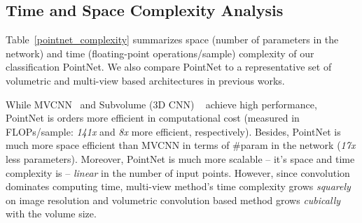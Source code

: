 \documentclass[10pt,twocolumn,letterpaper]{article}
\begin{document}
\begin{comment}
We start from a max pooled vector of a specific input point cloud , and find a set of point cloud  (it's a set of point sets) where each point cloud in the set  will result in the same max pooled vector as to . In another word, we will reconstruct the input with only the knowledge of  and the network parameters.

Assuming when feeding input point cloud  to the network the first max-pooling layer's output is , where . We achieve the reconstruction by firstly construct a dense volumetric grids. Each voxel represents a point in 3D space. Then we will sweep through each point  in the volume and judge whether this point's feature  has any value larger than that in the corresponding dimension of . If there is , it means the point  cannot be the input that results in , so we will exclude this point. After sweeping the volume, all the points left are possible to be part of the input set . This set of points forms a upper bound of any possible input set that gets max pooling outcome of . Some reconstructed results of this upper bound is visualized in the second row of Fig~\ref{fig:recon}.

On the other hand, if we know the input set (set ) and the network, we can know which input points (subset  of ) are actually contributing to the final value of the max pooled vector. Excluding all the points in  will not affect the result. We call this contributing set of points the lower bound of the input, as visualized in the third row of Fig~\ref{fig:recon}. Any point sets that fall between the lower bound and upper bound will result in exactly the same result.
\end{comment}





\subsection{Time and Space Complexity Analysis}
\label{sec:complexity}
Table~\ref{pointnet_complexity} summarizes space (number of parameters in the network) and time (floating-point operations/sample) complexity of our classification PointNet. We also compare PointNet to a representative set of volumetric and multi-view based architectures in previous works.

While MVCNN~\cite{su15mvcnn} and Subvolume (3D CNN) ~\cite{qi2016volumetric} achieve high performance, PointNet is orders more efficient in computational cost (measured in FLOPs/sample: \emph{141x} and \emph{8x} more efficient, respectively). Besides, PointNet is much more space efficient than MVCNN in terms of \#param in the network (\emph{17x} less parameters).
Moreover, PointNet is much more scalable -- it's space and time complexity is  -- \emph{linear} in the number of input points. However, since convolution dominates computing time, multi-view method's time complexity grows \emph{squarely} on image resolution and volumetric convolution based method grows \emph{cubically} with the volume size.
\end{document}
